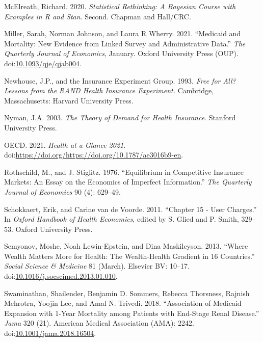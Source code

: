 \documentclass[a4paper,12pt]{article}
\begin{document}
\hypertarget{citeproc_bib_item_18}{McElreath, Richard. 2020. \textit{Statistical Rethinking: A Bayesian Course with Examples in R and Stan}. Second. Chapman and Hall/CRC.}

\hypertarget{citeproc_bib_item_19}{Miller, Sarah, Norman Johnson, and Laura R Wherry. 2021. “Medicaid and Mortality: New Evidence from Linked Survey and Administrative Data.” \textit{The Quarterly Journal of Economics}, January. Oxford University Press (OUP). doi:\href{https://doi.org/10.1093/qje/qjab004}{10.1093/qje/qjab004}.}

\hypertarget{citeproc_bib_item_20}{Newhouse, J.P., and the Insurance Experiment Group. 1993. \textit{Free for All? Lessons from the RAND Health Insurance Experiment.} Cambridge, Massachusetts: Harvard University Press.}

\hypertarget{citeproc_bib_item_21}{Nyman, J.A. 2003. \textit{The Theory of Demand for Health Insurance}. Stanford University Press.}

\hypertarget{citeproc_bib_item_22}{OECD. 2021. \textit{Health at a Glance 2021}. doi:\url{https://doi.org/https://doi.org/10.1787/ae3016b9-en}.}

\hypertarget{citeproc_bib_item_23}{Rothschild, M., and J. Stiglitz. 1976. “Equilibrium in Competitive Insurance Markets: An Essay on the Economics of Imperfect Information.” \textit{The Quarterly Journal of Economics} 90 (4): 629–49.}

\hypertarget{citeproc_bib_item_24}{Schokkaert, Erik, and Carine van de Voorde. 2011. “Chapter 15 - User Charges.” In \textit{Oxford Handbook of Health Economics}, edited by S. Glied and P. Smith, 329–53. Oxford University Press.}

\hypertarget{citeproc_bib_item_25}{Semyonov, Moshe, Noah Lewin-Epstein, and Dina Maskileyson. 2013. “Where Wealth Matters More for Health: The Wealth-Health Gradient in 16 Countries.” \textit{Social Science \& Medicine} 81 (March). Elsevier BV: 10–17. doi:\href{https://doi.org/10.1016/j.socscimed.2013.01.010}{10.1016/j.socscimed.2013.01.010}.}

\hypertarget{citeproc_bib_item_26}{Swaminathan, Shailender, Benjamin D. Sommers, Rebecca Thorsness, Rajnish Mehrotra, Yoojin Lee, and Amal N. Trivedi. 2018. “Association of Medicaid Expansion with 1-Year Mortality among Patients with End-Stage Renal Disease.” \textit{Jama} 320 (21). American Medical Association (AMA): 2242. doi:\href{https://doi.org/10.1001/jama.2018.16504}{10.1001/jama.2018.16504}.}
\end{document}
